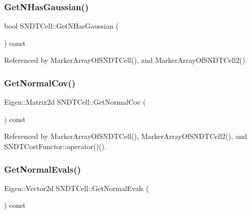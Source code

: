\mbox{\label{classSNDTCell_ac5cc4d7ad6313adff642df9ed301cd2a}} 
\subsubsection{\texorpdfstring{Get\+N\+Has\+Gaussian()}{GetNHasGaussian()}}
{\footnotesize\ttfamily bool S\+N\+D\+T\+Cell\+::\+Get\+N\+Has\+Gaussian (\begin{DoxyParamCaption}{ }\end{DoxyParamCaption}) const\hspace{0.3cm}{\ttfamily [inline]}}



Referenced by Marker\+Array\+Of\+S\+N\+D\+T\+Cell(), and Marker\+Array\+Of\+S\+N\+D\+T\+Cell2().

\mbox{\label{classSNDTCell_ae91704f179f9c610ebeebb2fc06e1236}} 
\subsubsection{\texorpdfstring{Get\+Normal\+Cov()}{GetNormalCov()}}
{\footnotesize\ttfamily Eigen\+::\+Matrix2d S\+N\+D\+T\+Cell\+::\+Get\+Normal\+Cov (\begin{DoxyParamCaption}{ }\end{DoxyParamCaption}) const\hspace{0.3cm}{\ttfamily [inline]}}



Referenced by Marker\+Array\+Of\+S\+N\+D\+T\+Cell(), Marker\+Array\+Of\+S\+N\+D\+T\+Cell2(), and S\+N\+D\+T\+Cost\+Functor\+::operator()().

\mbox{\label{classSNDTCell_aed8a9e840286d4ac69447fa25c3be2e3}} 
\subsubsection{\texorpdfstring{Get\+Normal\+Evals()}{GetNormalEvals()}}
{\footnotesize\ttfamily Eigen\+::\+Vector2d S\+N\+D\+T\+Cell\+::\+Get\+Normal\+Evals (\begin{DoxyParamCaption}{ }\end{DoxyParamCaption}) const\hspace{0.3cm}{\ttfamily [inline]}}

